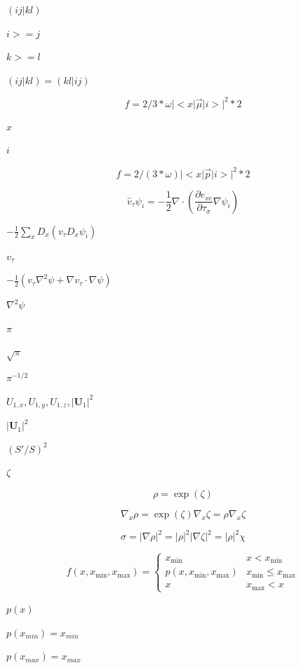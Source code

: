 \documentclass{article}
\begin{document}
$(ij|kl)$
\pagebreak

$i>=j$
\pagebreak

$k>=l$
\pagebreak

$(ij|kl)=(kl|ij)$
\pagebreak

\[
f = 2/3 * \omega |<x | \vec \mu | i >| ^2 * 2
\]
\pagebreak

$ x $
\pagebreak

$ i $
\pagebreak

\[
f = 2/(3 * \omega) |<x | \vec p | i >| ^2 * 2
\]
\pagebreak

\[
  \hat v_\tau \psi_i = -\frac{1}{2}\nabla\cdot
       \left(\frac{\partial e_{xc}}{\partial\tau_\sigma}\nabla\psi_i\right)
\]
\pagebreak

$ -\frac{1}{2}\sum_x D_x(v_\tau D_x\psi_i) $
\pagebreak

$ v_\tau $
\pagebreak

$ -\frac{1}{2}(v_\tau\nabla^2\psi + \nabla v_\tau\cdot\nabla\psi) $
\pagebreak

$\nabla^2\psi$
\pagebreak

$\pi$
\pagebreak

$\sqrt{\pi}$
\pagebreak

$\pi^{-1/2}$
\pagebreak

$ U_{1,x}, U_{1,y}, U_{1,z}, |\mathbf U_1|^2 $
\pagebreak

$ |\mathbf U_1|^2 $
\pagebreak

$ (S'/S)^2 $
\pagebreak

$ \zeta $
\pagebreak

\[
\rho = \exp(\zeta)
\]
\pagebreak

\[
\nabla_x\rho = \exp(\zeta)\nabla_x\zeta = \rho \nabla_x\zeta
\]
\pagebreak

\[
  \sigma = |\nabla\rho|^2 = |\rho|^2 |\nabla\zeta|^2 = |\rho|^2 \chi
\]
\pagebreak

\[
f(x,x_{\mathrm{min}},x_{\mathrm{max}}) = \left\{
  \begin{array}{ll}
    x_{\mathrm{min}}                       & x < x_{\mathrm{min}} \\
    p(x,x_{\mathrm{min}},x_{\mathrm{max}}) & x_{\mathrm{min}} \leq x_{\mathrm{max}} \\
    x                                      & x_{\mathrm{max}} < x
  \end{array}
\right.
\]
\pagebreak

$p(x)$
\pagebreak

$p(x_{min})=x_{min}$
\pagebreak

$p(x_{max})=x_{max}$
\pagebreak
\end{document}
